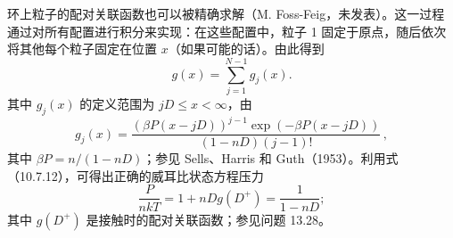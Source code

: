 环上粒子的配对关联函数也可以被精确求解（M. Foss-Feig，未发表）。这一过程通过对所有配置进行积分来实现：在这些配置中，粒子 1 固定于原点，随后依次将其他每个粒子固定在位置 \(x\)（如果可能的话）。由此得到
\begin{equation}\tag{13.1.6}\label{eq:13.1.6}
g ( x ) = \sum _ { j = 1 } ^{N - 1} g _ { j } ( x ) .
\end{equation}
其中 \(g_{j}(x)\) 的定义范围为 \(jD \leq x < \infty\)，由
\begin{equation}\tag{13.1.7}\label{eq:13.1.7}
g _ { j } ( x ) = \frac { ( \beta P ( x - j D ) ) ^{j - 1} \exp { ( - \beta P ( x - j D ) ) } } { ( 1 - n D ) ( j - 1 ) ! } \, ,
\end{equation}
其中 \(\beta P = n/(1 - nD)\)；参见 Sells、Harris 和 Guth（1953）。利用式（10.7.12），可得出正确的威耳比状态方程压力
\begin{equation}\tag{13.1.8}\label{eq:13.1.8}
\frac { P } { n k T } = 1 + n D g ( D ^{+} ) = \frac { 1 } { 1 - n D } ;
\end{equation}
其中 \(g(D^{+})\) 是接触时的配对关联函数；参见问题 13.28。
